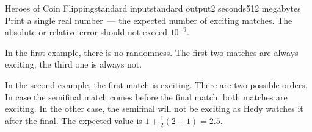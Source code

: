\begin{problem}{Heroes of Coin Flipping}{standard input}{standard output}{2 seconds}{512 megabytes}
\OutputFile
Print a single real number~--- the expected number of exciting matches. The absolute or relative error should not exceed $10^{-9}$.

\Examples

\begin{example}
%
%
%
%
\end{example}

\Note
In the first example, there is no randomness. The first two matches are always exciting, the third one is always not.

In the second example, the first match is exciting. There are two possible orders. In case the semifinal match comes before the final match, both matches are exciting. In the other case, the semifinal will not be exciting as Hedy watches it after the final. The expected value is $1 + \frac 12 (2 + 1) = 2.5$.

\end{problem}

